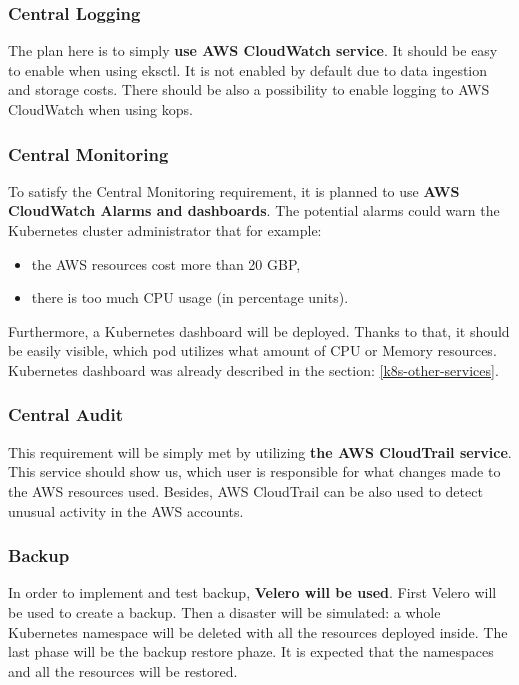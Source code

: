 \subsubsection{Central Logging}

The plan here is to simply \textbf{use AWS CloudWatch service}. It should be easy to enable when using eksctl. It is not enabled by default due to data ingestion and storage costs\cite{eksctl-cw}. There should be also a possibility to enable logging to AWS CloudWatch when using kops.

\subsubsection{Central Monitoring}

To satisfy the Central Monitoring requirement, it is planned to use \textbf{AWS CloudWatch Alarms and dashboards}. The potential alarms could warn the Kubernetes cluster administrator that for example:
\begin{itemize}
\item the AWS resources cost more than 20 GBP,
\item there is too much CPU usage (in percentage units).
\end{itemize}

Furthermore, a Kubernetes dashboard will be deployed. Thanks to that, it should be easily visible, which pod utilizes what amount of CPU or Memory resources. Kubernetes dashboard was already described in the section: \ref{k8s-other-services}.

\subsubsection{Central Audit}

This requirement will be simply met by utilizing \textbf{the AWS CloudTrail service}. This service should show us, which user is responsible for what changes made to the AWS resources used. Besides, AWS CloudTrail can be also used to detect unusual activity in the AWS accounts\cite{online-ct}.

\subsubsection{Backup}

In order to implement and test backup, \textbf{Velero will be used}. First Velero will be used to create a backup. Then a disaster will be simulated: a whole Kubernetes namespace will be deleted with all the resources deployed inside. The last phase will be the backup restore phaze. It is expected that the namespaces and all the resources will be restored\cite{eksworkshop-backup}.


